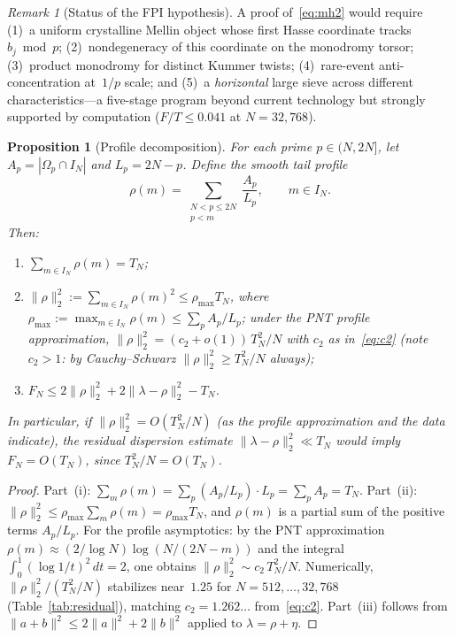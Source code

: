 \documentclass[11pt]{article}
\newtheorem{proposition}[theorem]{Proposition}
\theoremstyle{definition}
\theoremstyle{remark}
\newtheorem{remark}[theorem]{Remark}
\begin{document}
\begin{remark}[Status of the FPI hypothesis]
A proof of~\eqref{eq:mh2} would require
(1)~a uniform crystalline Mellin object
whose first Hasse coordinate
tracks~$b_j \bmod p$;
(2)~nondegeneracy of this coordinate
on the monodromy torsor;
(3)~product monodromy for distinct
Kummer twists;
(4)~rare-event anti-concentration
at~$1/p$ scale; and
(5)~a \emph{horizontal} large sieve
across different characteristics---a
five-stage program beyond current technology
but strongly supported by computation
($F/T \le 0.041$ at $N = 32{,}768$).
\end{remark}

\begin{proposition}[Profile decomposition]\label{prop:profile}
For each prime $p \in (N, 2N]$, let
$A_p = |\Omega_p \cap I_N|$
and $L_p = 2N - p$.
Define the smooth tail profile
\[
  \rho(m)
  = \sum_{\substack{N < p \le 2N \\ p < m}}
  \frac{A_p}{L_p},
  \qquad m \in I_N.
\]
Then:
\begin{enumerate}
\item[\textup{(i)}]
$\sum_{m \in I_N} \rho(m) = T_N$;
\item[\textup{(ii)}]
$\|\rho\|_2^2 := \sum_{m \in I_N} \rho(m)^2
\le \rho_{\max} T_N$, where
$\rho_{\max} := \max_{m \in I_N} \rho(m)
\le \sum_p A_p/L_p$;
under the PNT profile approximation,
$\|\rho\|_2^2 = (c_2 + o(1))\,T_N^2/N$
with $c_2$ as in~\eqref{eq:c2}
(note $c_2 > 1$: by Cauchy--Schwarz
$\|\rho\|_2^2 \ge T_N^2/N$ always);
\item[\textup{(iii)}]
$F_N \le 2\|\rho\|_2^2
+ 2\|\lambda - \rho\|_2^2 - T_N$.
\end{enumerate}
In particular, if
$\|\rho\|_2^2 = O(T_N^2/N)$
(as the profile approximation and the data indicate),
the residual dispersion estimate
$\|\lambda - \rho\|_2^2 \ll T_N$
would imply $F_N = O(T_N)$,
since $T_N^2/N = O(T_N)$.
\end{proposition}

\begin{proof}
Part~(i): $\sum_m \rho(m)
= \sum_p (A_p / L_p) \cdot L_p = \sum_p A_p = T_N$.
Part~(ii): $\|\rho\|_2^2 \le \rho_{\max}\sum_m\rho(m)
= \rho_{\max} T_N$, and $\rho(m)$ is a partial sum of
the positive terms $A_p/L_p$.
For the profile asymptotics: by the PNT approximation
$\rho(m) \approx (2/\!\log N)
\log(N/(2N{-}m))$ and the integral
$\int_0^1 (\log 1/t)^2\,dt = 2$, one obtains
$\|\rho\|_2^2 \sim c_2\,T_N^2/N$.
Numerically, $\|\rho\|_2^2 / (T_N^2/N)$
stabilizes near~$1.25$ for
$N = 512, \ldots, 32{,}768$
(Table~\ref{tab:residual}), matching
$c_2 = 1.262\ldots$ from~\eqref{eq:c2}.
Part~(iii) follows from
$\|a + b\|^2 \le 2\|a\|^2 + 2\|b\|^2$
applied to $\lambda = \rho + \eta$.
\end{proof}
\end{document}
